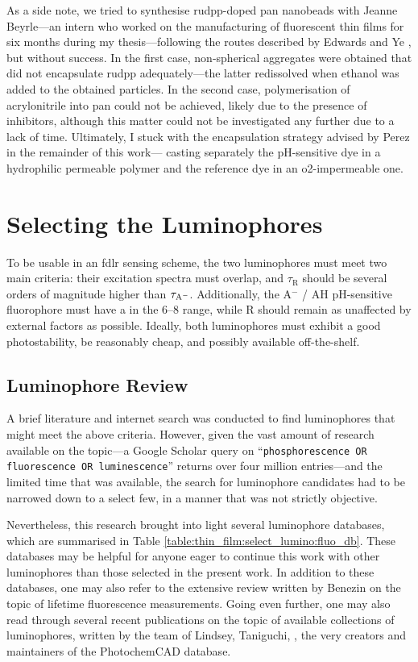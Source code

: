 As a side note, we tried to synthesise \gls{rudpp}-doped \gls{pan} nanobeads with Jeanne Beyrle---an intern who worked on the manufacturing of fluorescent thin films for six months during my thesis---following the routes described by Edwards\cite[Chap.~2]{edwards2011_phd} and Ye \etal{}\cite{ye2012}, but without success. In the first case, non-spherical aggregates were obtained that did not encapsulate \gls{rudpp} adequately---the latter redissolved when ethanol was added to the obtained particles. In the second case, polymerisation of acrylonitrile into \gls{pan} could not be achieved, likely due to the presence of inhibitors, although this matter could not be investigated any further due to a lack of time. Ultimately, I stuck with the encapsulation strategy advised by Perez \etal{} in the remainder of this work---\ie{} casting separately the pH-sensitive dye in a hydrophilic permeable polymer and the reference dye in an \gls{o2}-impermeable one.

\section{Selecting the Luminophores}\label{sect:thin_film:select_lumino}

To be usable in an \gls{fdlr} sensing scheme, the two luminophores must meet two main criteria: their excitation spectra must overlap, and $\tau_\mathrm{R}$ should be several orders of magnitude higher than $\tau_\mathrm{A^{\smash{-}}}$. Additionally, the A$^-$ / AH pH-sensitive fluorophore must have a \pKa{} in the 6--8 range, while R should remain as unaffected by external factors as possible. Ideally, both luminophores must exhibit a good photostability, be reasonably cheap, and possibly available off-the-shelf.

\subsection{Luminophore Review}

A brief literature and internet search was conducted to find luminophores that might meet the above criteria. However, given the vast amount of research available on the topic---a Google Scholar query on \enquote{\texttt{phosphorescence OR fluorescence OR luminescence}} returns over four million entries---and the limited time that was available, the search for luminophore candidates had to be narrowed down to a select few, in a manner that was not strictly objective.

Nevertheless, this research brought into light several luminophore databases, which are summarised in Table \ref{table:thin_film:select_lumino:fluo_db}. These databases may be helpful for anyone eager to continue this work with other luminophores than those selected in the present work. In addition to these databases, one may also refer to the extensive review written by Benezin \etal{}\cite{berezin2010} on the topic of lifetime fluorescence measurements. Going even further, one may also read through several recent publications on the topic of available collections of luminophores, written by the team of Lindsey, Taniguchi, \etal{}\cite{taniguchi2018a, taniguchi2018b}, the very creators and maintainers of the PhotochemCAD database.


